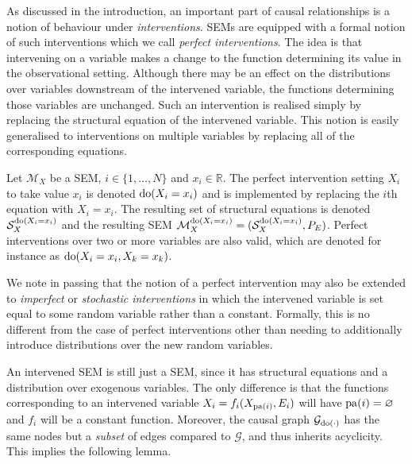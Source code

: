 As discussed in the introduction, an important part of causal relationships is a notion of behaviour under \emph{interventions}. SEMs are equipped with a formal notion of such interventions which we call \emph{perfect interventions}. The idea is that intervening on a variable makes a change to the function determining its value in the observational setting.  Although there may be an effect on the distributions over variables downstream of the intervened variable, the functions determining those variables are unchanged. Such an intervention is realised simply by replacing the structural equation of the intervened variable. This notion is easily generalised to interventions on multiple variables by replacing all of the corresponding equations. 

\medskip

\begin{definition}
	Let $\mathcal{M}_X$ be a SEM, $i \in \{1,\ldots,N \}$ and $x_i \in \mathbb{R}$. The perfect intervention setting $X_i$ to take value $x_i$ is denoted $\operatorname{do}(X_i = x_i)$ and is implemented by replacing the $i$th equation with $X_i = x_i$. The resulting set of structural equations is denoted $\mathcal{S}_X^{\operatorname{do}(X_i=x_i)}$ and the resulting SEM $\mathcal{M}_X^{\operatorname{do}(X_i=x_i)} = (\mathcal{S}_X^{\operatorname{do}(X_i=x_i)}, P_E)$.
	Perfect interventions over two or more variables are also valid, which are denoted for instance as $\operatorname{do}(X_i = x_i, X_k = x_k)$.
\end{definition}

We note in passing that the notion of a perfect intervention may also be extended to \emph{imperfect} or \emph{stochastic interventions} in which the intervened variable is set equal to some random variable rather than a constant. Formally, this is no different from the case of perfect interventions other than needing to additionally introduce distributions over the new random variables. 

An intervened SEM is still just a SEM, since it has structural equations and a distribution over exogenous variables. The only difference is that the functions corresponding to an intervened variable $X_i = f_i(X_{\operatorname{pa}(i)}, E_i)$ will have $\operatorname{pa}(i) = \varnothing$ and $f_i$ will be a constant function. Moreover, the causal graph $\mathcal{G}_{\operatorname{do}(\cdot)}$ has the same nodes but a \emph{subset} of edges compared to $\mathcal{G}$, and thus inherits acyclicity. This implies the following lemma.

